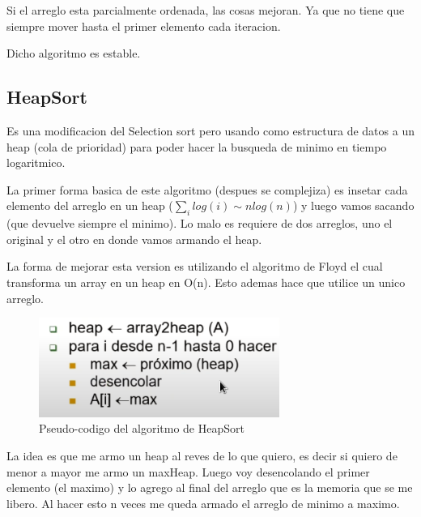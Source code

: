 \documentclass[11pt]{article}
\begin{document}
Si el arreglo esta parcialmente ordenada, las cosas mejoran.
Ya que no tiene que siempre mover hasta el primer elemento
cada iteracion.

Dicho algoritmo es estable.

\subsection{HeapSort}
Es una modificacion del Selection sort pero usando como estructura
de datos a un heap (cola de prioridad) para poder hacer la busqueda de minimo
en tiempo logaritmico.

La primer forma basica de este algoritmo (despues se complejiza)
es insetar cada elemento del arreglo en un heap ($\sum_i log(i)\sim nlog(n)$) y luego vamos
sacando (que devuelve siempre el minimo). Lo malo es requiere
de dos arreglos, uno el original y el otro en donde vamos armando
el heap.

La forma de mejorar esta version es utilizando el algoritmo de Floyd
el cual transforma un array en un heap en O(n).
Esto ademas hace que utilice un unico arreglo.

\begin{figure}[h!]
    \centering
    \includegraphics[width=0.7\textwidth]{heapsort.png}
    \caption{Pseudo-codigo del algoritmo de HeapSort}
    \label{fig:heapsort}
\end{figure}

La idea es que me armo un heap al reves de lo que quiero,
es decir si quiero de menor a mayor me armo un maxHeap.
Luego voy desencolando el primer elemento (el maximo) y lo
agrego al final del arreglo que es la memoria que se me libero.
Al hacer esto n veces me queda armado el arreglo de minimo a maximo.
\end{document}
